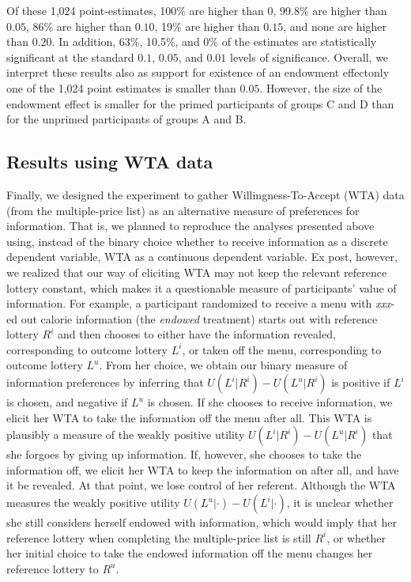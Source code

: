 \documentclass[12pt]{article}
\begin{document}
Of these 1,024 point-estimates, 100\% are higher than $0$, 99.8\% are higher than $0.05$, 86\% are higher than $0.10$, 19\% are higher than $0.15$, and none are higher than $0.20$. In addition, 63\%, 10.5\%, and 0\% of the estimates are statistically significant at the standard $0.1$, $0.05$, and $0.01$ levels of significance. Overall, we interpret these results also as support for existence of an endowment effect\textemdash only one of the 1,024 point estimates is smaller than $0.05$. However, the size of the endowment effect is smaller for the primed participants of groups C and D than for the unprimed participants of groups A and B.

\subsection{Results using WTA data}

Finally, we designed the experiment to gather Willingness-To-Accept (WTA) data (from the multiple-price list) as an alternative measure of preferences for information. That is, we planned to reproduce the analyses presented above using, instead of the binary choice whether to receive information as a discrete dependent variable, WTA as a continuous dependent variable. Ex post, however, we realized that our way of eliciting WTA may not keep the relevant reference lottery constant, which makes it a questionable measure of participants’ value of information. For example, a participant randomized to receive a menu with \emph{xxx}-ed out calorie information (the \emph{endowed} treatment) starts out with reference lottery $R^i$ and then chooses to either have the information revealed, corresponding to outcome lottery $L^i$, or taken off the menu, corresponding to outcome lottery $L^u$. From her choice, we obtain our binary measure of information preferences by inferring that $U(L^i|R^i)-U(L^u|R^i)$ is positive if $L^i$ is chosen, and negative if $L^u$ is chosen. If she chooses to receive information, we elicit her WTA to take the information off the menu after all. This WTA is plausibly a measure of the weakly positive utility $U(L^i|R^i)-U(L^u|R^i)$ that she forgoes by giving up information. If, however, she chooses to take the information off, we elicit her WTA to keep the information on after all, and have it be revealed. At that point, we lose control of her referent. Although the WTA measures the weakly positive utility $U(L^u|\cdot)-U(L^i|\cdot)$, it is unclear whether she still considers herself endowed with information, which would imply that her reference lottery when completing the multiple-price list is still $R^i$, or whether her initial choice to take the endowed information off the menu changes her reference lottery to $R^u$.
\end{document}
